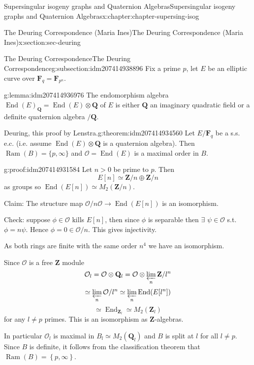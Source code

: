 \documentclass[oneside,10pt,]{book}
\numberwithin{equation}{section}
\newcommand{\lb}{[}
\newcommand{\rb}{]}
\newcommand{\ZZ}{\mathbf{Z}}
\newcommand{\QQ}{\mathbf{Q}}
\newcommand{\FF}{\mathbf{F}}
\newcommand{\ints}{\mathcal{O}}
\DeclareMathOperator{\End}{End}
\newcommand{\gt}{>}
\begin{document}
\begin{chapterptx}{Supersingular isogeny graphs and Quaternion Algebras}{}{Supersingular isogeny graphs and Quaternion Algebras}{}{}{x:chapter:chapter-supersing-isog}
\begin{sectionptx}{The Deuring Correspondence (Maria Ines)}{}{The Deuring Correspondence (Maria Ines)}{}{}{x:section:sec-deuring}
\typeout{************************************************}
%
\begin{subsectionptx}{The Deuring Correspondence}{}{The Deuring Correspondence}{}{}{g:subsection:idm207414938896}
Fix a prime \(p\), let \(E\) be an elliptic curve over \(\FF_q = \FF_{p^n}\).%
\begin{lemma}{}{}{g:lemma:idm207414936976}%
The endomorphism algebra  \(\End(E)_\QQ = \End(E) \otimes \QQ\) of \(E\) is either \(\QQ\) an imaginary quadratic field or a definite quaternion algebra \(/\QQ\).%
\end{lemma}
\begin{theorem}{Deuring, this proof by Lenstra.}{}{g:theorem:idm207414934560}%
Let \(E/\FF_q\) be a s.s. e.c. (i.e. assume \(\End(E) \otimes \QQ\) is a quaternion algebra). Then \(\operatorname{Ram}(B)  =    \{p, \infty\}\) and \(\ints = \End(E) \) is a maximal order in \(B\).%
\end{theorem}
\begin{proofptx}{}{g:proof:idm207414931584}
Let \(n \gt 0\)  be prime to \(p \). Then%
\begin{equation*}
E \lb n \rb  \simeq \ZZ/ n \oplus \ZZ/n
\end{equation*}
as groups so \(\End(E\lb n\rb ) \simeq M_2(\ZZ/n)\).%
\par
Claim: The structure map \(\ints/n\ints  \to \End(E\lb n \rb)\) is an isomorphism.%
\par
Check: suppose \(\phi \in  \ints\) kills \(E\lb n \rb\), then since \(\phi\) is separable then \(\exists\) \(\psi \in \ints\) s.t. \(\phi = n \psi\). Hence \(\phi = 0 \in \ints/n\). This gives injectivity.%
\par
As both rings are finite with the same order \(n^4\) we have an isomorphism.%
\par
Since \(\ints\) is a free \(\ZZ\) module%
\begin{equation*}
\ints_l = \ints \otimes \QQ_l = \ints \otimes \varprojlim _n \ZZ/l^n
\end{equation*}
%
\begin{equation*}
\simeq \varprojlim_n \ints/l^n \simeq \varprojlim_n \End(E[l^n])
\end{equation*}
%
\begin{equation*}
\simeq \End_{\ZZ_l}  \simeq M_2( \ZZ_l)
\end{equation*}
for any \(l \ne p\) primes. This is an isomorphism as \(\ZZ\)-algebras.%
\par
In particular \(\ints_l\) is maximal in \(B_l \simeq M_2(\QQ_l)\) and \(B\) is split at \(l\) for all \(l\ne p\). Since \(B\) is definite, it follows from the classification theorem that \(\operatorname{Ram}(B)  = \left\{ p, \infty \right\}\).%

\end{proofptx}
\end{subsectionptx}
\end{sectionptx}
\end{chapterptx}
\end{document}

